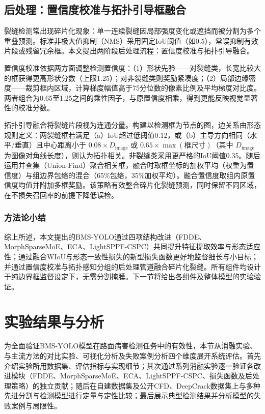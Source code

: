 \documentclass[twocolumn]{sn-jnl}
\begin{document}
	\subsection{后处理：置信度校准与拓扑引导框融合}
	裂缝检测常出现碎片化现象：单一连续裂缝因局部强度变化或遮挡而被分割为多个重叠预测。标准非极大值抑制（NMS）采用固定IoU阈值（如0.5），常误抑制有效片段或残留冗余框。本文提出两阶段后处理流程：置信度校准与拓扑引导融合。
	
	置信度校准依据两方面调整检测置信度：（1）形状先验——对裂缝类，长宽比较大的框获得更高形状分数（上限1.25）；对非裂缝类则奖励紧凑度；（2）局部边缘密度——裁剪框内区域，计算梯度幅值高于75分位数的像素比例及平均梯度对比度。两者组合为0.65至1.25之间的乘性因子，与原置信度相乘，得到更能反映视觉显著性的校准分数。
	
	拓扑引导融合将裂缝片段视为连通分量。构建以检测框为节点的图，边关系由形态规则定义：两裂缝框若满足（a）IoU超过低阈值0.12，或（b）主导方向相同（水平/垂直）且中心距离小于 \(0.08 \times D_{\text{image}}\) 或 \(0.65 \times \max(\text{框尺寸})\)（其中 \(D_{\text{image}}\) 为图像对角线长度），则认为拓扑相关。非裂缝类采用更严格的IoU阈值0.35。随后运用并查集（Union-Find）聚合相关框，融合时取框坐标的加权平均（权重为置信度）与组边界包络的混合（65\%包络，35\%加权平均）。融合置信度取组内原置信度均值并附加多框奖励。该策略有效整合碎片化裂缝预测，同时保留不同区域，在不损失召回率的前提下降低误检。
	
	\subsubsection{方法论小结}
	综上所述，本文提出的BMS-YOLO通过四项结构改进（FDDE、MorphSparseMoE、ECA、LightSPPF-CSPC）共同提升特征提取效率与形态适应性；通过融合WIoU与形态一致性损失的新型损失函数更好地监督细长与小目标；并通过置信度校准与拓扑感知分组的后处理管道融合碎片化裂缝。所有组件均设计于纯边界框监督设定下，无需分割掩膜。下一节将给出各组件及整体模型的实验验证。
	
	\section{实验结果与分析}
	为全面验证BMS-YOLO模型在路面病害检测任务中的有效性，本节从消融实验、与主流方法的对比实验、可视化分析及失败案例分析四个维度展开系统评估。首先介绍实验所用数据集、评估指标与实现细节；其次通过系列消融实验逐一验证各改进模块（FDDE、MorphSparseMoE、ECA、LightSPPF-CSPC、损失函数及后处理策略）的独立贡献；随后在自建数据集及公开CFD、DeepCrack数据集上与多种先进分割与检测模型进行定量与定性比较；最后展示典型检测结果并分析模型的失败案例与局限性。
	
\end{document}
